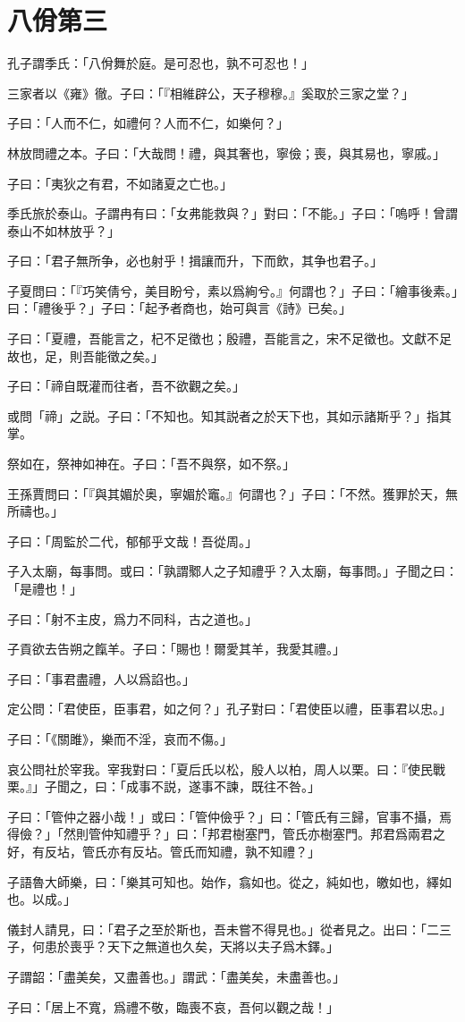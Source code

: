 \section[八佾第三]{八佾第三}

孔子謂季氏：「八佾舞於庭。是可忍也，孰不可忍也！」

三家者以《雍》徹。子曰：「『相維辟公，天子穆穆。』奚取於三家之堂？」

子曰：「人而不仁，如禮何？人而不仁，如樂何？」

林放問禮之本。子曰：「大哉問！禮，與其奢也，寧儉；喪，與其易也，寧戚。」

子曰：「夷狄之有君，不如諸夏之亡也。」

季氏旅於泰山。子謂冉有曰：「女弗能救與？」對曰：「不能。」子曰：「嗚呼！曾謂泰山不如林放乎？」

子曰：「君子無所争，必也射乎！揖讓而升，下而飲，其争也君子。」

子夏問曰：「『巧笑倩兮，美目盼兮，素以爲絢兮。』何謂也？」子曰：「繪事後素。」曰：「禮後乎？」子曰：「起予者商也，始可與言《詩》已矣。」

子曰：「夏禮，吾能言之，杞不足徵也；殷禮，吾能言之，宋不足徵也。文獻不足故也，足，則吾能徵之矣。」

子曰：「禘自既灌而往者，吾不欲觀之矣。」

或問「禘」之説。子曰：「不知也。知其説者之於天下也，其如示諸斯乎？」指其掌。

祭如在，祭神如神在。子曰：「吾不與祭，如不祭。」

王孫賈問曰：「『與其媚於奥，寧媚於竈。』何謂也？」子曰：「不然。獲罪於天，無所禱也。」

子曰：「周監於二代，郁郁乎文哉！吾從周。」

子入太廟，每事問。或曰：「孰謂鄹人之子知禮乎？入太廟，每事問。」子聞之曰：「是禮也！」

子曰：「射不主皮，爲力不同科，古之道也。」

子貢欲去告朔之餼羊。子曰：「賜也！爾愛其羊，我愛其禮。」

子曰：「事君盡禮，人以爲諂也。」

定公問：「君使臣，臣事君，如之何？」孔子對曰：「君使臣以禮，臣事君以忠。」

子曰：「《關雎》，樂而不淫，哀而不傷。」

哀公問社於宰我。宰我對曰：「夏后氏以松，殷人以柏，周人以栗。曰：『使民戰栗。』」子聞之，曰：「成事不説，遂事不諫，既往不咎。」

子曰：「管仲之器小哉！」或曰：「管仲儉乎？」曰：「管氏有三歸，官事不攝，焉得儉？」「然則管仲知禮乎？」曰：「邦君樹塞門，管氏亦樹塞門。邦君爲兩君之好，有反坫，管氏亦有反坫。管氏而知禮，孰不知禮？」

子語魯大師樂，曰：「樂其可知也。始作，翕如也。從之，純如也，皦如也，繹如也。以成。」

儀封人請見，曰：「君子之至於斯也，吾未嘗不得見也。」從者見之。出曰：「二三子，何患於喪乎？天下之無道也久矣，天將以夫子爲木鐸。」

子謂韶：「盡美矣，又盡善也。」謂武：「盡美矣，未盡善也。」

子曰：「居上不寬，爲禮不敬，臨喪不哀，吾何以觀之哉！」
